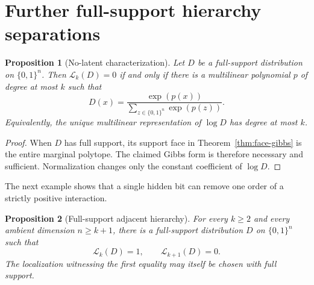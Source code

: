 \documentclass{article}
\newcommand{\LC}{\mathcal{L}}
\newcommand{\bits}{\{0,1\}}
\newtheorem{proposition}{Proposition}
\begin{document}
\section{Further full-support hierarchy separations}
\label{app:full-support-hierarchy}

\begin{proposition}[No-latent characterization]\label{prop:positive-no-latent}
Let $D$ be a full-support distribution on $\bits^n$.  Then
$\LC_k(D)=0$ if and only if there is a multilinear polynomial $p$ of degree at
most $k$ such that
\[
  D(x)=\frac{\exp(p(x))}{\sum_{z\in\bits^n}\exp(p(z))}.
\]
Equivalently, the unique multilinear representation of $\log D$ has degree at
most $k$.
\end{proposition}

\begin{proof}
When $D$ has full support, its support face in
Theorem~\ref{thm:face-gibbs} is the entire marginal polytope.  The claimed
Gibbs form is therefore necessary and sufficient.  Normalization changes only
the constant coefficient of $\log D$.
\end{proof}

The next example shows that a single hidden bit can remove one order of a
strictly positive interaction.

\begin{proposition}[Full-support adjacent hierarchy]
\label{prop:positive-hierarchy}
For every $k\ge2$ and every ambient dimension $n\ge k+1$, there is a
full-support distribution $D$ on $\bits^n$ such that
\[
  \LC_k(D)=1,
  \qquad
  \LC_{k+1}(D)=0.
\]
The localization witnessing the first equality may itself be chosen with full
support.
\end{proposition}
\end{document}
